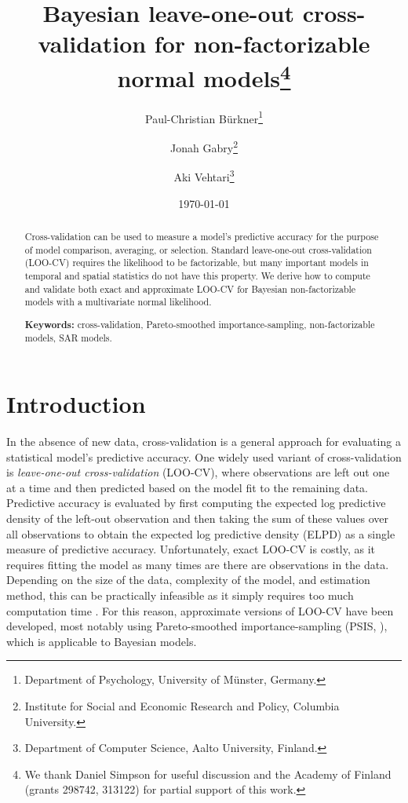 \documentclass[11pt]{article}
\title{\bf Bayesian leave-one-out cross-validation for non-factorizable normal models\footnote{
We thank Daniel Simpson for useful discussion and the Academy of Finland
(grants 298742, 313122) for partial support of this work.
}\vspace{.1in}}
\author{Paul-Christian B\"{u}rkner\footnote{Department of Psychology, University of M\"{u}nster, Germany.}
  \and Jonah Gabry\footnote{Institute for Social and Economic Research and Policy, Columbia University.}
  \and Aki Vehtari\footnote{Department of Computer Science, Aalto University, Finland.
}\vspace{.1in}}
\date{\today \vspace{-.1in}}
\begin{document}
\sloppy
\maketitle
\thispagestyle{empty}

\begin{abstract}
Cross-validation can be used to measure a model's predictive accuracy for the purpose 
of model comparison, averaging, or selection. Standard leave-one-out cross-validation 
(LOO-CV) requires the likelihood to be factorizable, but many important models in temporal 
and spatial statistics do not have this property. We derive how to compute and validate 
both exact and approximate LOO-CV for Bayesian non-factorizable models with a multivariate 
normal likelihood. 

\textbf{Keywords:} cross-validation, Pareto-smoothed importance-sampling,
  non-factorizable models, SAR models.
\end{abstract}


\section{Introduction}


In the absence of new data, cross-validation is a general approach for evaluating 
a statistical model's predictive accuracy. One widely used variant of cross-validation 
is \emph{leave-one-out cross-validation} (LOO-CV), where observations are left out one 
at a time and then predicted based on the model fit to the remaining data. Predictive
accuracy is evaluated by first computing the expected log predictive density of
the left-out observation and then taking the sum of these values over all observations
to obtain the expected log predictive density (ELPD) as a single measure of predictive
accuracy. Unfortunately, exact LOO-CV is costly, as it requires fitting the model
as many times are there are observations in the data. Depending on the size of
the data, complexity of the model, and estimation method, this can be
practically infeasible as it simply requires too much computation time \citep{vehtari2017loo}.
For this reason, approximate versions of LOO-CV have been developed, most
notably using Pareto-smoothed importance-sampling 
(PSIS, \cite{vehtari2017loo, vehtari2017psis}), which is applicable to Bayesian models.
\end{document}
